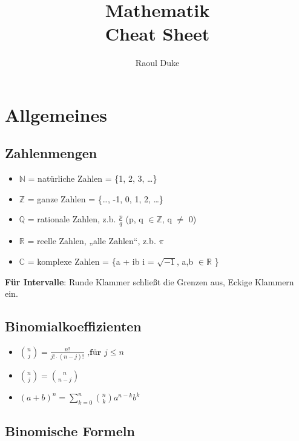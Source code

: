 \documentclass[german]{latex4ei/latex4ei_sheet}
\title{Mathematik \\ Cheat Sheet}
\author{Raoul Duke}
\begin{document}
\maketitle   %

\section{Allgemeines}

\begin{sectionbox}
\subsection{Zahlenmengen}\label{zahlenmengen}

\begin{itemize}
\item
  $\mathbb{N}$ = natürliche Zahlen = \{1, 2, 3, \ldots{}\}
\item
  $\mathbb{Z}$ = ganze Zahlen = \{\ldots{}, -1, 0, 1, 2, \ldots{}\}
\item
  $\mathbb{Q}$ = rationale Zahlen, z.b. \(\frac{p}{q}\) (p, q \(\in \mathbb{Z}\), q \(\neq\) 0)
\item
  $\mathbb{R}$ = reelle Zahlen, „alle Zahlen``, z.b. \(\pi\)
\item
  $\mathbb{C}$ = komplexe Zahlen = \{a + ib \textbar{} i = \(\sqrt{- 1}\), a,b \(\in \mathbb{R}\) \}
\end{itemize}

\textbf{Für Intervalle}:
Runde Klammer schließt die Grenzen aus, Eckige Klammern ein. 

\subsection{Binomialkoeffizienten}
\begin{itemize}
    \item ${n \choose j} = \frac{n!}{j!\cdot (n-j)!} \textbf{ ,für }j\leq n$
    \item  ${n \choose j} = {n \choose n-j}$
    \item  $(a+b)^n = \sum\limits_{k=0}^n {n\choose k} a^{n-k} b^k $
\end{itemize} 



\subsection{Binomische Formeln}\label{binomische-formeln}


\end{sectionbox}
\end{document}
